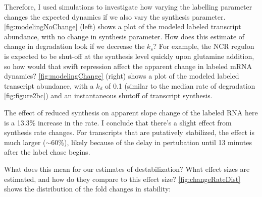 Therefore, I used simulations to investigate how varying the labelling
parameter changes the expected dynamics if we also vary the synthesis
parameter. \autoref{fig:modelingNoChange} (left) shows a plot of the modeled
labeled transcript abundance, with no change in synthesis parameter.
How does this estimate of change in degradation look if we decrease the
\(k_s\)? For example, the NCR regulon is expected to be shut-off at the
synthesis level quickly upon glutamine addition, so how would that swift
repression affect the apparent change in labeled mRNA dynamics?
\autoref{fig:modelingChange} (right) shows a plot of the modeled
labeled transcript abundance, with a $k_d$ of 0.1 (similar to the
median rate of degradation \autoref{fig:figure2bc}) 
and an instantaneous shutoff of transcript synthesis.


The effect of reduced synthesis on apparent slope change of the 
labeled RNA here is a 13.3\% increase in the rate.
I conclude that there's a slight effect from synthesis rate changes.
For transcripts that are putatively stabilized, the effect is 
much larger ($\sim$60\%), likely because of the delay in pertubation
until 13 minutes after the label chase begins.

What does this mean for our estimates of destabilization? What effect
sizes are estimated, and how do they compare to this effect size?
\autoref{fig:changeRateDist} shows the distribution of the fold changes in
stability:


